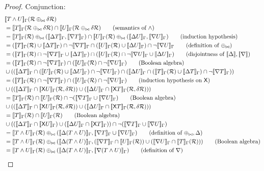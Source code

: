 \begin{proof}
  Conjunction:
  \begin{align*}
    &\sem{T \wedge U}_\Gamma(\semR \twist \diffR)\\
    &= \sem{T}_\Gamma(\semR \twist \diffR) \cap \sem{U}_\Gamma(\semR \twist \diffR) \tag{semantics of $\wedge$}\\
    &= \sem{T}_\Gamma(\semR) \twist (\upsem{T}_\Gamma, \downsem{T}_\Gamma) 
      \cap \sem{U}_\Gamma(\semR) \twist (\upsem{U}_\Gamma, \downsem{U}_\Gamma) \tag{induction hypothesis}\\
    &= (\sem{T}_\Gamma(\semR) \cup \upsem{T}_\Gamma) \cap \neg \downsem{T}_\Gamma 
      \cap (\sem{U}_\Gamma(\semR) \cup \upsem{U}_\Gamma) \cap \neg \downsem{U}_\Gamma \tag{definition of $\twist$}\\
    &= (\sem{T}_\Gamma(\semR) \cap \neg \downsem{T}_\Gamma \cup \upsem{T}_\Gamma)
      \cap (\sem{U}_\Gamma(\semR) \cap \neg \downsem{U}_\Gamma \cup \upsem{U}_\Gamma) \tag{disjointness of $\upsem{}, \downsem{}$}\\
    &= (\sem{T}_\Gamma(\semR) \cap \neg \downsem{T}_\Gamma) \cap (\sem{U}_\Gamma(\semR) \cap \neg \downsem{U}_\Gamma) \tag{Boolean algebra}\\
    & \cup ((\upsem{T}_\Gamma \cap (\sem{U}_\Gamma(\semR) \cup \upsem{U}_\Gamma) \cap \neg \downsem{U}_\Gamma)
      \cap (\upsem{U}_\Gamma \cap (\sem{T}_\Gamma(\semR) \cup \upsem{T}_\Gamma) \cap \neg \downsem{T}_\Gamma))\\
    &= (\sem{T}_\Gamma(\semR) \cap \neg \downsem{T}_\Gamma) \cap (\sem{U}_\Gamma(\semR) \cap \neg \downsem{U}_\Gamma) \tag{induction hypothesis on $\bothdiff$}\\
    & \cup ((\upsem{T}_\Gamma \cap \bothsem{U}_\Gamma(\semR, \diffR))
            \cup (\upsem{U}_\Gamma \cap \bothsem{T}_\Gamma(\semR, \diffR)))\\
    &= \sem{T}_\Gamma(\semR) \cap \sem{U}_\Gamma(\semR) \cap \neg (\downsem{T}_\Gamma \cup \downsem{U}_\Gamma) \tag{Boolean algebra}\\
      &\cup ((\upsem{T}_\Gamma \cap \bothsem{U}_\Gamma(\semR, \diffR))
            \cup (\upsem{U}_\Gamma \cap \bothsem{T}_\Gamma(\semR, \diffR)))\\
    &= \sem{T}_\Gamma(\semR) \cap \sem{U}_\Gamma(\semR) \tag{Boolean algebra}\\
    & \cup ((\upsem{T}_\Gamma \cap \bothsem{U}_\Gamma)
            \cup (\upsem{U}_\Gamma \cap \bothsem{T}_\Gamma))
      \cap \neg (\downsem{T}_\Gamma \cup \downsem{U}_\Gamma)\\
    &= \sem{T \wedge U}_\Gamma(\semR)
      \twist (\upsem{(T \wedge U)}_\Gamma, \downsem{T}_\Gamma \cup \downsem{U}_\Gamma) \tag{definition of $\twist, \updiff$}\\
    &= \sem{T \wedge U}_\Gamma(\semR)
      \twist (\upsem{(T \wedge U)}_\Gamma, 
      (\downsem{T}_\Gamma \cap \sem{U}_\Gamma(\semR)) \cup (\downsem{U}_\Gamma \cap \sem{T}_\Gamma(\semR))) \tag{Boolean algebra}\\
    &= \sem{T \wedge U}_\Gamma(\semR)
      \twist (\upsem{(T \wedge U)}_\Gamma, \downsem{(T \wedge U)}_\Gamma) \tag{definition of $\downdiff{}$}
  \end{align*}
  

\end{proof}
